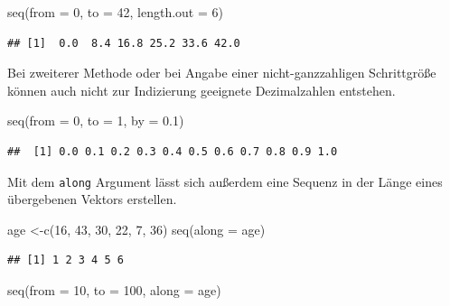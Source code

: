 \documentclass[
]{book}
\newenvironment{Shaded}{\begin{snugshade}}{\end{snugshade}}
\newcommand{\AttributeTok}[1]{\textcolor[rgb]{0.77,0.63,0.00}{#1}}
\newcommand{\DecValTok}[1]{\textcolor[rgb]{0.00,0.00,0.81}{#1}}
\newcommand{\FloatTok}[1]{\textcolor[rgb]{0.00,0.00,0.81}{#1}}
\newcommand{\FunctionTok}[1]{\textcolor[rgb]{0.00,0.00,0.00}{#1}}
\newcommand{\NormalTok}[1]{#1}
\newcommand{\OtherTok}[1]{\textcolor[rgb]{0.56,0.35,0.01}{#1}}
\begin{document}
\begin{Shaded}
\begin{Highlighting}[]
\FunctionTok{seq}\NormalTok{(}\AttributeTok{from =} \DecValTok{0}\NormalTok{, }\AttributeTok{to =} \DecValTok{42}\NormalTok{, }\AttributeTok{length.out =} \DecValTok{6}\NormalTok{)}
\end{Highlighting}
\end{Shaded}

\begin{verbatim}
## [1]  0.0  8.4 16.8 25.2 33.6 42.0
\end{verbatim}

Bei zweiterer Methode oder bei Angabe einer nicht-ganzzahligen Schrittgröße können auch nicht zur Indizierung geeignete Dezimalzahlen entstehen.

\begin{Shaded}
\begin{Highlighting}[]
\FunctionTok{seq}\NormalTok{(}\AttributeTok{from =} \DecValTok{0}\NormalTok{, }\AttributeTok{to =} \DecValTok{1}\NormalTok{, }\AttributeTok{by =} \FloatTok{0.1}\NormalTok{)}
\end{Highlighting}
\end{Shaded}

\begin{verbatim}
##  [1] 0.0 0.1 0.2 0.3 0.4 0.5 0.6 0.7 0.8 0.9 1.0
\end{verbatim}

Mit dem \texttt{along} Argument lässt sich außerdem eine Sequenz in der Länge eines übergebenen Vektors erstellen.

\begin{Shaded}
\begin{Highlighting}[]
\NormalTok{age }\OtherTok{\textless{}{-}}\FunctionTok{c}\NormalTok{(}\DecValTok{16}\NormalTok{, }\DecValTok{43}\NormalTok{, }\DecValTok{30}\NormalTok{, }\DecValTok{22}\NormalTok{,  }\DecValTok{7}\NormalTok{, }\DecValTok{36}\NormalTok{)}
\FunctionTok{seq}\NormalTok{(}\AttributeTok{along =}\NormalTok{ age)}
\end{Highlighting}
\end{Shaded}

\begin{verbatim}
## [1] 1 2 3 4 5 6
\end{verbatim}

\begin{Shaded}
\begin{Highlighting}[]
\FunctionTok{seq}\NormalTok{(}\AttributeTok{from =} \DecValTok{10}\NormalTok{, }\AttributeTok{to =} \DecValTok{100}\NormalTok{, }\AttributeTok{along =}\NormalTok{ age)}
\end{Highlighting}
\end{Shaded}
\end{document}
